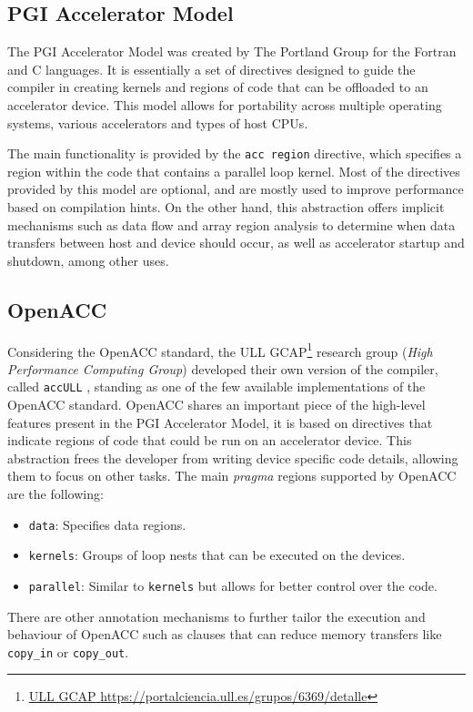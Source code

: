 \subsection{PGI Accelerator Model}

The PGI Accelerator Model \cite{Portland:2010:PGI} was created by The Portland Group for the Fortran and C languages.
It is essentially a set of directives designed to guide the compiler in creating kernels and regions of code that can be offloaded to an accelerator device.
This model allows for portability across multiple operating systems, various accelerators and types of host CPUs.

The main functionality is provided by the \texttt{acc region} directive, which specifies a region within the code that contains a parallel loop kernel.
Most of the directives provided by this model are optional, and are mostly used to improve performance based on compilation hints.
On the other hand, this abstraction offers implicit mechanisms such as data flow and array region analysis to determine when data transfers between host and device should occur, as well as accelerator startup and shutdown, among other uses.

\subsection{OpenACC}

Considering the OpenACC standard, the ULL GCAP\footnote{\href{https://portalciencia.ull.es/grupos/6369/detalle}{{ULL GCAP} \url{https://portalciencia.ull.es/grupos/6369/detalle}}} research group (\textit{High Performance Computing Group}) developed their own version of the compiler, called \texttt{accULL} \cite{Reyes:2012:Directive}, standing as one of the few available implementations of the OpenACC standard.
OpenACC shares an important piece of the high-level features present in the PGI Accelerator Model, it is based on directives that indicate regions of code that could be run on an accelerator device.
This abstraction frees the developer from writing device specific code details, allowing them to focus on other tasks.
The main \textit{pragma} regions supported by OpenACC are the following:
\begin{itemize}
    \item \texttt{data}: Specifies data regions.
    \item \texttt{kernels}: Groups of loop nests that can be executed on the devices.
    \item \texttt{parallel}: Similar to \texttt{kernels} but allows for better control over the code.
\end{itemize}

There are other annotation mechanisms to further tailor the execution and behaviour of OpenACC such as clauses that can reduce memory transfers like \texttt{copy\_in} or \texttt{copy\_out}.
